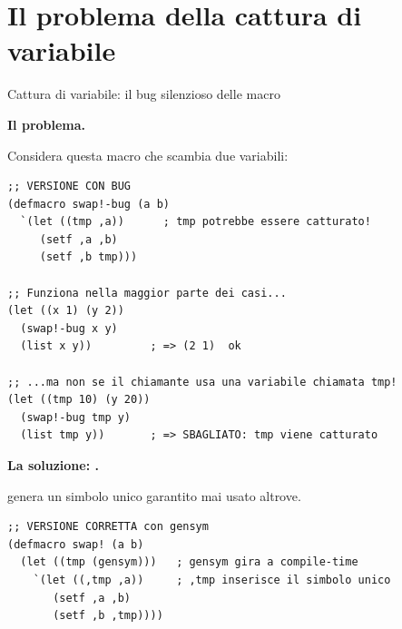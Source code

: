 \section{Il problema della cattura di variabile}

\begin{concetto}{Cattura di variabile: il bug silenzioso delle macro}
\end{concetto}

\begin{tcolorbox}[
  enhanced,
  colback=black!2, colframe=black!20,
  arc=3pt, boxrule=0.4pt,
  left=12pt, right=12pt, top=9pt, bottom=9pt,
  before skip=8pt, after skip=10pt
]
\small\color{black!65}

\textbf{Il problema.}

\medskip
Considera questa macro  che scambia due variabili:

\begin{tcolorbox}[enhanced, colback=clBg, colframe=gray!40,
  arc=2pt, boxrule=0.4pt, left=8pt, right=6pt, top=4pt, bottom=4pt,
  before skip=4pt, after skip=4pt]
\begin{lstlisting}
;; VERSIONE CON BUG
(defmacro swap!-bug (a b)
  `(let ((tmp ,a))      ; tmp potrebbe essere catturato!
     (setf ,a ,b)
     (setf ,b tmp)))

;; Funziona nella maggior parte dei casi...
(let ((x 1) (y 2))
  (swap!-bug x y)
  (list x y))         ; => (2 1)  ok

;; ...ma non se il chiamante usa una variabile chiamata tmp!
(let ((tmp 10) (y 20))
  (swap!-bug tmp y)
  (list tmp y))       ; => SBAGLIATO: tmp viene catturato
\end{lstlisting}
\end{tcolorbox}

\medskip
\textbf{La soluzione: .}

 genera un simbolo unico garantito mai usato altrove.

\begin{tcolorbox}[enhanced, colback=clBg, colframe=gray!40,
  arc=2pt, boxrule=0.4pt, left=8pt, right=6pt, top=4pt, bottom=4pt,
  before skip=4pt, after skip=4pt]
\begin{lstlisting}
;; VERSIONE CORRETTA con gensym
(defmacro swap! (a b)
  (let ((tmp (gensym)))   ; gensym gira a compile-time
    `(let ((,tmp ,a))     ; ,tmp inserisce il simbolo unico
       (setf ,a ,b)
       (setf ,b ,tmp))))


\end{lstlisting}
\end{tcolorbox}
\end{tcolorbox}
